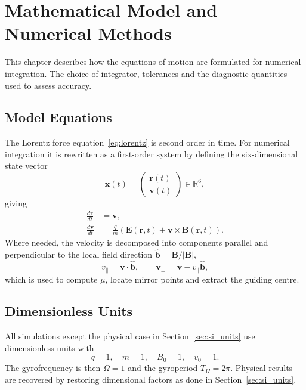 \chapter{Mathematical Model and Numerical Methods}
\label{ch:model}

This chapter describes how the equations of motion are formulated for numerical integration. The choice of integrator, tolerances and the diagnostic quantities used to assess accuracy.

\section{Model Equations}
\label{sec:model_eqs}

The Lorentz force equation~\eqref{eq:lorentz} is second order in time. For numerical integration it is rewritten as a first-order system by defining the six-dimensional state vector
\begin{equation}
  \mathbf{x}(t) = \begin{pmatrix} \mathbf{r}(t) \\ \mathbf{v}(t)
    \end{pmatrix} \in \mathbb{R}^6,
  \label{eq:state}
\end{equation}
giving
\begin{align}
  \frac{d\mathbf{r}}{dt} &= \mathbf{v}, \label{eq:drdt} \\
  \frac{d\mathbf{v}}{dt} &= \frac{q}{m}
    \left(\mathbf{E}(\mathbf{r},t) + \mathbf{v} \times
    \mathbf{B}(\mathbf{r},t)\right). \label{eq:dvdt}
\end{align}
Where needed, the velocity is decomposed into components parallel and perpendicular to the local field direction
$\hat{\mathbf{b}} = \mathbf{B}/|\mathbf{B}|$,
\begin{equation}
  v_\parallel = \mathbf{v} \cdot \hat{\mathbf{b}}, \qquad
  \mathbf{v}_\perp = \mathbf{v} - v_\parallel \hat{\mathbf{b}},
  \label{eq:vpar_vperp}
\end{equation}
which is used to compute $\mu$, locate mirror points and extract the guiding centre.

\section{Dimensionless Units}
\label{sec:units}

All simulations except the physical case in Section~\ref{sec:si_units} use dimensionless units with
\begin{equation}
  q = 1, \quad m = 1, \quad B_0 = 1, \quad v_0 = 1.
  \label{eq:dimless}
\end{equation}
The gyrofrequency is then $\Omega = 1$ and the gyroperiod $T_\Omega = 2\pi$. Physical results are recovered by restoring
dimensional factors as done in Section~\ref{sec:si_units}.

